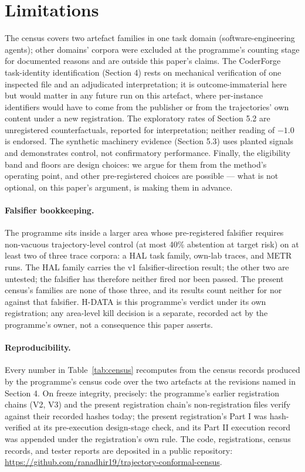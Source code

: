 \documentclass[11pt]{article}
\begin{document}
\section{Limitations}

The census covers two artefact families in one task domain
(software-engineering agents); other domains' corpora were
excluded at the programme's counting stage for documented
reasons and are outside this paper's claims. The CoderForge
task-identity identification (Section 4) rests on mechanical
verification of one inspected file and an adjudicated
interpretation; it is outcome-immaterial here but would matter
in any future run on this artefact, where per-instance
identifiers would have to come from the publisher or from the
trajectories' own content under a new registration. The
exploratory rates of Section 5.2 are unregistered
counterfactuals, reported for interpretation; neither reading
of $-1.0$ is endorsed. The synthetic machinery evidence
(Section 5.3) uses planted signals and demonstrates control,
not confirmatory performance. Finally, the eligibility band
and floors are design choices: we argue for them from the
method's operating point, and other pre-registered choices are
possible --- what is not optional, on this paper's argument,
is making them in advance.

\paragraph{Falsifier bookkeeping.} The programme sits inside a
larger area whose pre-registered falsifier requires
non-vacuous trajectory-level control (at most 40\% abstention
at target risk) on at least two of three trace corpora: a HAL
task family, own-lab traces, and METR runs. The HAL family
carries the v1 falsifier-direction result; the other two are
untested; the falsifier has therefore neither fired nor been
passed. The present census's families are none of those three,
and its results count neither for nor against that falsifier.
H-DATA is this programme's verdict under its own registration;
any area-level kill decision is a separate, recorded act by
the programme's owner, not a consequence this paper asserts.

\paragraph{Reproducibility.} Every number in Table~\ref{tab:census}
recomputes from the census records produced by the programme's
census code over the two artefacts at the revisions named in
Section 4. On freeze integrity, precisely: the programme's
earlier registration chains (V2, V3) and the present
registration chain's non-registration files verify against
their recorded hashes today; the present registration's Part I
was hash-verified at its pre-execution design-stage check, and
its Part II execution record was appended under the
registration's own rule. The code, registrations, census
records, and tester reports are deposited in a public
repository: \url{https://github.com/ranadhir19/trajectory-conformal-census}.
\end{document}
